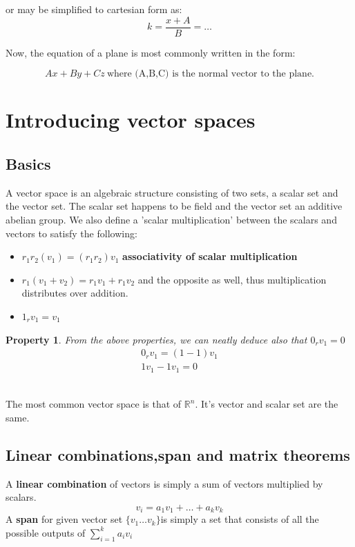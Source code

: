 \documentclass[titlepage]{article}
\newtheorem{property}{Property}
\numberwithin{equation}{subsection}
\begin{document}
or may be simplified to cartesian form as: 
\begin{equation*}
    k = \frac{x + A}{B} = \ldots
\end{equation*}

Now, the equation of a plane is most commonly written in the form: 

\begin{equation*}
    Ax + By + Cz \ \text{where (A,B,C) is the normal vector to the plane.}
\end{equation*}

\section{Introducing vector spaces}
\subsection{Basics}
A vector space is an algebraic structure consisting of two sets, a scalar set and the vector set. The scalar set happens to be field and the vector set an additive abelian group. We also define a 'scalar multiplication' between the scalars and vectors to satisfy the following:

\begin{itemize}
    \item $r_{1}r_{2}(v_{1}) = (r_{1}r_{2})v_{1}$  \textbf{associativity of scalar multiplication}
    \item $r_{1}(v_{1}+v_{2}) = r_{1}v_{1}+ r_{1}v_{2}$ and the opposite as well, thus multiplication distributes over addition.
    \item $1_{r}v_{1} = v_{1}$
\end{itemize}

\begin{property}
From the above properties, we can neatly deduce also that $0_{r}v_{1} = 0$
\begin{align*}
    0_{r}v_{1} = (1-1)v_{1}\\
    1v_{1} - 1v_{1} = 0
\end{align*}
\end{property}
\\
The most common vector space is that of $\mathbb{R}^{n}$. It's vector and scalar set are the same. 
\subsection{Linear combinations,span and matrix theorems}

\begin{tcolorbox}
  A \textbf{linear combination} of vectors is simply a sum of vectors multiplied by scalars. 
  \begin{equation*}
      v_{i} = a_{1}v_{1} + \ldots + a_{k}v_{k}
  \end{equation*}
  A \textbf{span} for given vector set $\{v_{1}\ldots v_{k}\}$is simply a set that consists of all the possible outputs of $\sum_{i=1}^{k} a_{i}v_{i}$
\end{tcolorbox}
\end{document}
